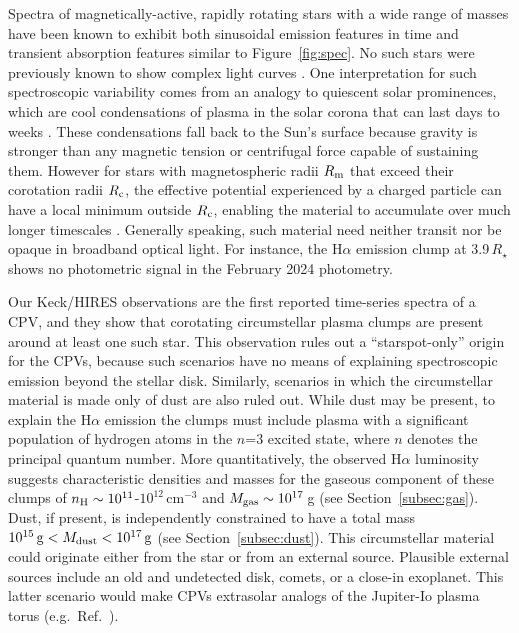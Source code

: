 \documentclass{nature3}
\begin{document}
Spectra of magnetically-active, rapidly rotating stars with a wide range
of masses have been known to exhibit both sinusoidal emission features
in time
\cite{Donati2000,Townsend2005,Dunstone2006,Skelly2008} and
transient absorption features
\cite{CollierCameron1989,CollierCameron1992,Cang2020} similar to
Figure~\ref{fig:spec}.  No such stars were previously known to show
complex light curves \cite{Bouma2024}.   One interpretation for
such spectroscopic variability comes from an analogy to quiescent solar
prominences, which are cool condensations of plasma in the solar corona
that can last days to weeks \cite{VialEngvold2015}.  These
condensations fall back to the Sun's surface because gravity is
stronger than any magnetic tension or centrifugal force capable of
sustaining them.  However for stars with magnetospheric radii $R_{\rm
m}$ that exceed their corotation radii $R_{\rm c}$, the effective
potential experienced by a charged particle can have a local minimum
outside $R_{\rm c}$, enabling the material to accumulate over much
longer timescales \cite{Petit2013,Daley-Yates2024}.  Generally
speaking, such material need neither transit nor be opaque in
broadband optical light.
For instance, the H$\alpha$ emission clump at 3.9\,$R_\star$ shows no 
photometric signal in the February 2024 photometry.

Our Keck/HIRES observations are the first reported time-series spectra
of a CPV, and they show that corotating circumstellar plasma clumps
are present around at least one such star.  This observation rules out
a ``starspot-only'' origin for the CPVs, \cite{Koen2021} because
such scenarios have no means of explaining spectroscopic emission
beyond the stellar disk.  Similarly, scenarios in which the
circumstellar material is made only of dust are also ruled out.  While
dust may be present, to explain the H$\alpha$ emission the clumps must
include plasma with a significant population of hydrogen atoms in the
$n$=3 excited state, where $n$ denotes the principal quantum number.
More quantitatively, the observed H$\alpha$ luminosity suggests
characteristic densities and masses for the gaseous component of these
clumps of $n_{\rm H} \sim 10^{11}$-$10^{12}$\,cm$^{-3}$ and $M_{\rm
gas} \sim 10^{17}$\,g (see Section~\ref{subsec:gas}).  Dust, if
present, is independently constrained to have a total mass
$10^{15}\,{\rm g} < M_{\rm dust} < 10^{17}\,{\rm g}$ (see
Section~\ref{subsec:dust}).  This circumstellar material could
originate either from the star or from an external source.  Plausible
external sources include an old and undetected disk, comets, or a
close-in exoplanet.  This latter scenario would make CPVs extrasolar
analogs of the Jupiter-Io plasma torus (e.g.~Ref.~\cite{Bagenal1981}).
\end{document}
